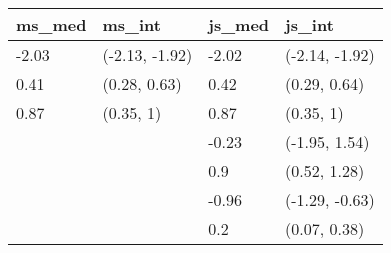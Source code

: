 
\begin{tabular}{llll}
\toprule
ms\_med & ms\_int & js\_med & js\_int\\
\midrule
-2.03 & (-2.13, -1.92) & -2.02 & (-2.14, -1.92)\\
0.41 & (0.28, 0.63) & 0.42 & (0.29, 0.64)\\
0.87 & (0.35, 1) & 0.87 & (0.35, 1)\\
 &  & -0.23 & (-1.95, 1.54)\\
 &  & 0.9 & (0.52, 1.28)\\
 &  & -0.96 & (-1.29, -0.63)\\
 &  & 0.2 & (0.07, 0.38)\\
\bottomrule
\end{tabular}

